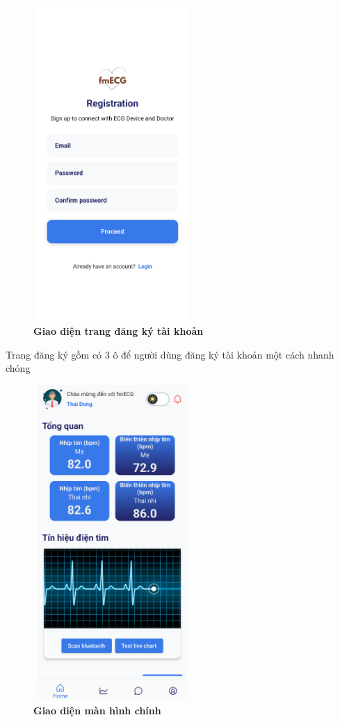 \begin{figure}[H]
  \centering
  \includegraphics[width=6cm,height=12cm]{Images/mobile_app/demo/register.png}
  \caption[Giao diện trang đăng ký tài khoản]{\bfseries \fontsize{12pt}{0pt}\selectfont Giao diện trang đăng ký tài khoản}
  \label{demo_register} %
\end{figure}

Trang đăng ký gồm có 3 ô để người dùng đăng ký tài khoản một cách nhanh chóng

\begin{figure}[H]
  \centering
  \includegraphics[width=6cm,height=12cm]{Images/mobile_app/demo/home_screen.png}
  \caption[Giao diện màn hình chính]{\bfseries \fontsize{12pt}{0pt}\selectfont Giao diện màn hình chính}
  \label{demo_} %
\end{figure}

